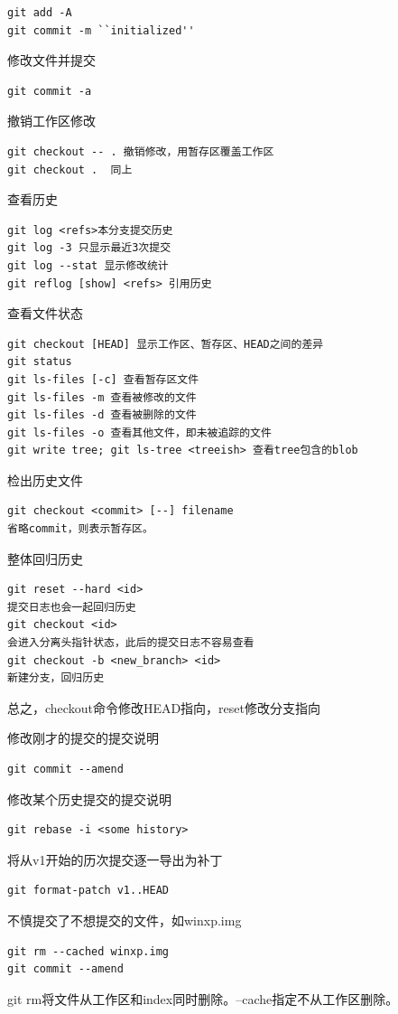\begin{verbatim}
git add -A
git commit -m ``initialized''
\end{verbatim}


修改文件并提交
\begin{verbatim}
git commit -a
\end{verbatim}

撤销工作区修改
\begin{verbatim}
git checkout -- . 撤销修改，用暂存区覆盖工作区
git checkout .  同上
\end{verbatim}

查看历史
\begin{verbatim}
git log <refs>本分支提交历史
git log -3 只显示最近3次提交
git log --stat 显示修改统计
git reflog [show] <refs> 引用历史
\end{verbatim}

查看文件状态
\begin{verbatim}
git checkout [HEAD] 显示工作区、暂存区、HEAD之间的差异
git status
git ls-files [-c] 查看暂存区文件
git ls-files -m 查看被修改的文件
git ls-files -d 查看被删除的文件
git ls-files -o 查看其他文件，即未被追踪的文件
git write tree; git ls-tree <treeish> 查看tree包含的blob
\end{verbatim}

检出历史文件
\begin{verbatim}
git checkout <commit> [--] filename
省略commit，则表示暂存区。
\end{verbatim}

整体回归历史
\begin{verbatim}
git reset --hard <id> 
提交日志也会一起回归历史
git checkout <id> 
会进入分离头指针状态，此后的提交日志不容易查看
git checkout -b <new_branch> <id>
新建分支，回归历史
\end{verbatim}
总之，checkout命令修改HEAD指向，reset修改分支指向

修改刚才的提交的提交说明
\begin{verbatim}
git commit --amend
\end{verbatim}

修改某个历史提交的提交说明
\begin{verbatim}
git rebase -i <some history>
\end{verbatim}

将从v1开始的历次提交逐一导出为补丁
\begin{verbatim}
git format-patch v1..HEAD
\end{verbatim}

不慎提交了不想提交的文件，如winxp.img
\begin{verbatim}
git rm --cached winxp.img
git commit --amend
\end{verbatim}
git rm将文件从工作区和index同时删除。--cache指定不从工作区删除。

